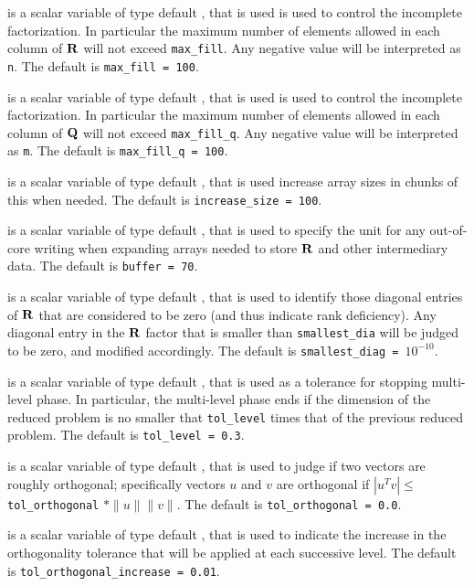 \documentclass{galahad}
\begin{document}
\begin{description}
 is a scalar variable of type default \integer, that is used
is used to control the incomplete factorization. In particular
the maximum number of elements allowed in each column of ${\mathbf{R}}$ will not exceed
{\tt max\_fill}.
Any negative value will be interpreted as {\tt n}.
The default is {\tt max\_fill = 100}.

 is a scalar variable of type default \integer, that is used
is used to control the incomplete factorization. In particular
the maximum number of elements allowed in each column of ${\mathbf{Q}}$ will not exceed
{\tt max\_fill\_q}.
Any negative value will be interpreted as {\tt m}.
The default is {\tt max\_fill\_q = 100}.

  is a scalar variable of type default \integer, that is 
used increase array sizes in chunks of this when needed.
The default is {\tt increase\_size = 100}.

 is a scalar variable of type default \integer, that is used
to specify the unit for any out-of-core writing when expanding arrays
needed to store ${\mathbf{R}}$ and other intermediary data. 
The default is {\tt buffer = 70}.

 is a scalar variable of type default \realdp, that is used
to identify those diagonal entries of ${\mathbf{R}}$ that are considered to be zero
(and thus indicate rank deficiency). Any diagonal entry in the ${\mathbf{R}}$
factor that is smaller than {\tt smallest\_dia} will be judged to be zero, 
and modified accordingly.
The default is {\tt smallest\_diag = }$10^{-10}$.

 is a scalar variable of type default \realdp, that is used
as a tolerance for stopping multi-level phase. In particular, the
multi-level phase ends if the dimension of the reduced problem 
is no smaller that {\tt tol\_level} times that of the previous
reduced problem.
The default is {\tt tol\_level = 0.3}.

 is a scalar variable of type default \realdp, 
that is used to judge if two vectors are roughly orthogonal; specifically
vectors $u$ and $v$ are orthogonal if $|u^T v| \leq$ {\tt tol\_orthogonal} 
$\ast \|u\| \|v\|$.
The default is {\tt tol\_orthogonal = 0.0}.

 is a scalar variable of type default \realdp, 
that is used to indicate the increase in the orthogonality tolerance 
that will be applied at each successive level.
The default is {\tt tol\_orthogonal\_increase = 0.01}.


\end{description}
\end{document}

